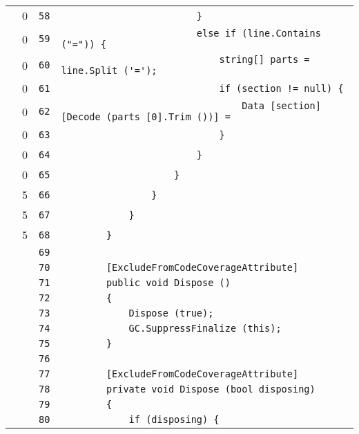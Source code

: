 \documentclass[a4paper,10pt]{article}
\begin{document}
\begin{longtable}[l]{lrrl}
\cellcolor{red} & 0 & \verb~58~ & \verb~                        }~\\
\cellcolor{red} & 0 & \verb~59~ & \verb~                        else if (line.Contains ("=")) {~\\
\cellcolor{red} & 0 & \verb~60~ & \verb~                            string[] parts = line.Split ('=');~\\
\cellcolor{red} & 0 & \verb~61~ & \verb~                            if (section != null) {~\\
\cellcolor{red} & 0 & \verb~62~ & \verb~                                Data [section] [Decode (parts [0].Trim ())] = ~\\
\cellcolor{red} & 0 & \verb~63~ & \verb~                            }~\\
\cellcolor{red} & 0 & \verb~64~ & \verb~                        }~\\
\cellcolor{red} & 0 & \verb~65~ & \verb~                    }~\\
\cellcolor{green} & 5 & \verb~66~ & \verb~                }~\\
\cellcolor{green} & 5 & \verb~67~ & \verb~            }~\\
\cellcolor{green} & 5 & \verb~68~ & \verb~        }~\\
\cellcolor{gray} &  & \verb~69~ & \verb~~\\
\cellcolor{gray} &  & \verb~70~ & \verb~        [ExcludeFromCodeCoverageAttribute]~\\
\cellcolor{gray} &  & \verb~71~ & \verb~        public void Dispose ()~\\
\cellcolor{gray} &  & \verb~72~ & \verb~        {~\\
\cellcolor{gray} &  & \verb~73~ & \verb~            Dispose (true);~\\
\cellcolor{gray} &  & \verb~74~ & \verb~            GC.SuppressFinalize (this);~\\
\cellcolor{gray} &  & \verb~75~ & \verb~        }~\\
\cellcolor{gray} &  & \verb~76~ & \verb~~\\
\cellcolor{gray} &  & \verb~77~ & \verb~        [ExcludeFromCodeCoverageAttribute]~\\
\cellcolor{gray} &  & \verb~78~ & \verb~        private void Dispose (bool disposing)~\\
\cellcolor{gray} &  & \verb~79~ & \verb~        {~\\
\cellcolor{gray} &  & \verb~80~ & \verb~            if (disposing) {~\\

\end{longtable}
\end{document}

